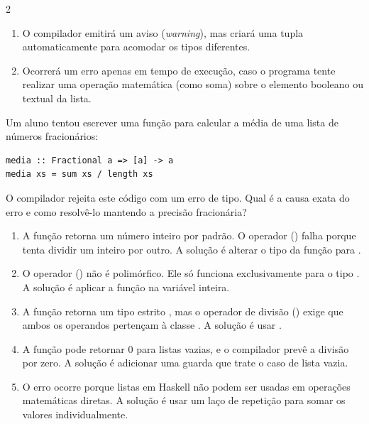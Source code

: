 \documentclass[a4paper,10pt,brazil]{article}
\begin{document}
\begin{multicols}{2}
\begin{enumerate}
  \item O compilador emitirá um aviso (\emph{warning}), mas criará uma tupla automaticamente para acomodar os tipos diferentes.

  \item Ocorrerá um erro apenas em tempo de execução, caso o programa tente realizar uma operação matemática (como soma) sobre o elemento booleano ou textual da lista.


\end{enumerate}

Um aluno tentou escrever uma função para calcular a média de uma lista de números fracionários:
\begin{verbatim}
media :: Fractional a => [a] -> a
media xs = sum xs / length xs
\end{verbatim}
O compilador rejeita este código com um erro de tipo. Qual é a causa exata do erro e como resolvê-lo mantendo a precisão fracionária?

\begin{enumerate}
  \item A função  retorna um número inteiro por padrão. O operador (\haskellinline{/}) falha porque tenta dividir um inteiro por outro. A solução é alterar o tipo da função para .

  \item O operador (\haskellinline{/}) não é polimórfico. Ele só funciona exclusivamente para o tipo . A solução é aplicar a função  na variável  inteira.

  \item A função  retorna um tipo estrito , mas o operador de divisão (\haskellinline{/}) exige que ambos os operandos pertençam à classe . A solução é usar .

  \item A função  pode retornar 0 para listas vazias, e o compilador prevê a divisão por zero. A solução é adicionar uma guarda que trate o caso de lista vazia.

  \item O erro ocorre porque listas em Haskell não podem ser usadas em operações matemáticas diretas. A solução é usar um laço de repetição  para somar os valores individualmente.



\end{enumerate}
\end{multicols}
\end{document}
